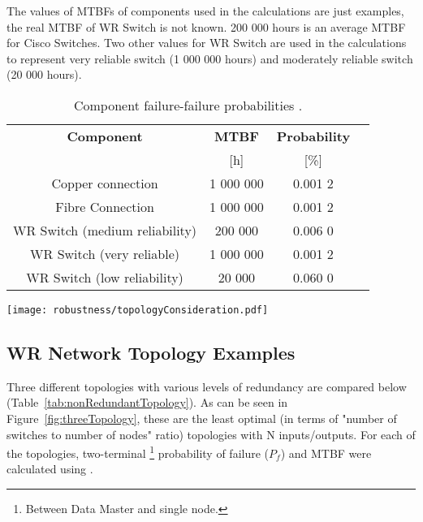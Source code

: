 The values of MTBFs of components used in the calculations are just examples,
the real MTBF of WR Switch is not known. 200 000 hours is an average MTBF for
Cisco Switches. Two other values for WR Switch are used in the calculations to
represent very reliable switch (1 000 000 hours) and moderately reliable switch
(20 000 hours). 
\begin{table}[ht]
\caption{Component failure-failure probabilities \cite{The All-New Switch Book:
The Complete Guide to LAN Switching Technology}. }
\centering
\begin{tabular}{|c|c|c|c|}          \hline
\textbf{Component}& \textbf{MTBF} & \textbf{Probability} \\
                  &    [h]       &        [\%]   \\ \hline
Copper connection &   1 000 000   &   0.001 2  \\ \hline
Fibre Connection  &   1 000 000   &   0.001 2  \\ \hline
WR Switch (medium reliability)&     200 000   &   0.006 0  \\ \hline
WR Switch (very reliable)     &   1 000 000   &   0.001 2  \\ \hline
WR Switch (low reliability)   &      20 000   &   0.060 0 \\ \hline

\end{tabular}
\label{tab:MTBFandProbabilityOfComponents}
\end{table}


\begin{center}
	\texttt{[image: robustness/topologyConsideration.pdf]}
	\label{fig:topologyConsideration}
\end{center}

\subsection{WR Network Topology Examples}
\label{WRnetworkTopologyExamples}
Three different topologies with various levels of redundancy are compared
below (Table~\ref{tab:nonRedundantTopology}). As can be seen in
Figure~\ref{fig:threeTopology}, these are the least
optimal (in terms of "number of switches to number of nodes" ratio) topologies
with N inputs/outputs. For each of the topologies, two-terminal
\footnote{Between Data Master and single node.} probability of failure ($P_f$)
and MTBF were calculated using \cite{FaultTree}. 

